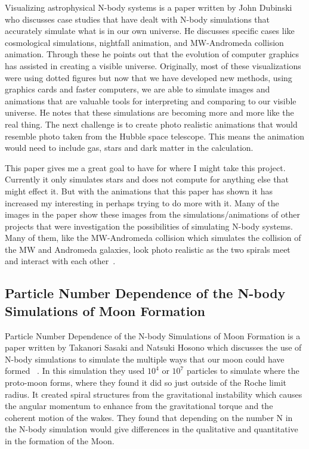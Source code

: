 \documentclass{egpubl}
\begin{document}
    Visualizing astrophysical N-body systems is a paper written by John Dubinski who discusses case studies that have dealt with N-body simulations that accurately simulate what is in our own universe. He discusses specific cases like cosmological simulations, nightfall animation, and MW-Andromeda collision animation. Through these he points out that the evolution of computer graphics has assisted in creating a visible universe. Originally, most of these visualizations were using dotted figures but now that we have developed new methods, using graphics cards and faster computers, we are able to simulate images and animations that are valuable tools for interpreting and comparing to our visible universe. He notes that these simulations are becoming more and more like the real thing. The next challenge is to create photo realistic animations that would resemble photo taken from the Hubble space telescope. This means the animation would need to include gas, stars and dark matter in the calculation. 

    This paper gives me a great goal to have for where I might take this project. Currently it only simulates stars and does not compute for anything else that might effect it. But with the animations that this paper has shown it has increased my interesting in perhaps trying to do more with it. Many of the images in the paper show these images from the simulations/animations of other projects that were investigation the possibilities of simulating N-body systems. Many of them, like the MW-Andromeda collision which simulates the collision of the MW and Andromeda galaxies, look photo realistic as the two spirals meet and interact with each other~\cite{dubinski2008visualizing}.

\subsection{Particle Number Dependence of the N-body Simulations of Moon Formation}

    Particle Number Dependence of the N-body Simulations of Moon Formation is a paper written by Takanori Sasaki and Natsuki Hosono which discusses the use of N-body simulations to simulate the multiple ways that our moon could have formed ~\cite{sasaki2018particle}. In this simulation they used $10^4$ or $10^7$ particles to simulate where the proto-moon forms, where they found it did so just outside of the Roche limit radius. It created spiral structures from the gravitational instability which causes the angular momentum to enhance from the gravitational torque and the coherent motion of the wakes. They found that depending on the number N in the N-body simulation would give differences in the qualitative and quantitative in the formation of the Moon.
\end{document}
